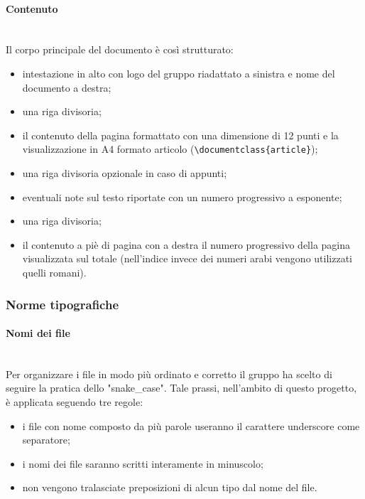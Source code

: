             \paragraph{Contenuto}\mbox{}\\ [1mm]
                Il corpo principale del documento è così strutturato:
                \begin{itemize}
                    \item intestazione in alto con logo del gruppo riadattato a sinistra e nome del documento a destra;
                    \item una riga divisoria;
                    \item il contenuto della pagina formattato con una dimensione di 12 punti e la visualizzazione in A4 formato articolo
                          (\verb|\documentclass{article}|);
                    \item una riga divisoria opzionale in caso di appunti;
                    \item eventuali note sul testo riportate con un numero progressivo a esponente;
                    \item una riga divisoria;
                    \item il contenuto a piè di pagina con a destra il numero progressivo della pagina visualizzata sul totale (nell'indice invece dei numeri
                          arabi vengono utilizzati quelli romani).
                \end{itemize}
        \subsubsection{Norme tipografiche}
                \paragraph{Nomi dei file}\mbox{}\\ [1mm]
                    Per organizzare i file in modo più ordinato e corretto il gruppo ha scelto di seguire la pratica dello "snake\_case"\glo.
                    Tale prassi, nell'ambito di questo progetto\glo, è applicata seguendo tre regole:
                    \begin{itemize}
                        \item i file con nome composto da più parole useranno il carattere underscore come separatore;
                        \item i nomi dei file saranno scritti interamente in minuscolo;
                        \item non vengono tralasciate preposizioni di alcun tipo dal nome del file.
                    \end{itemize}
